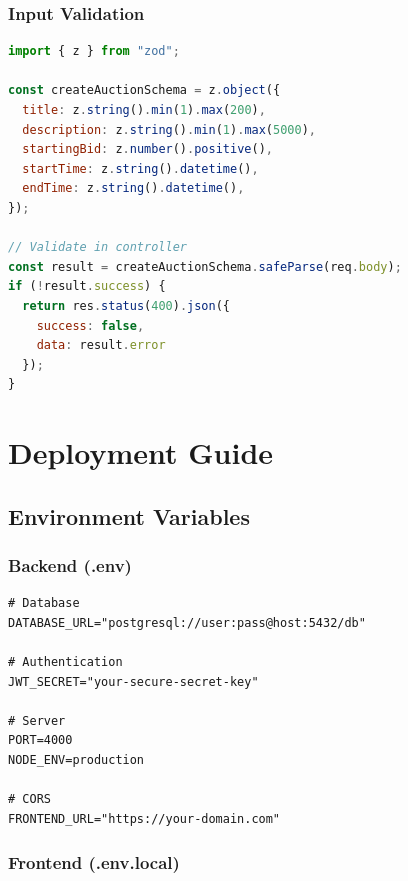 \documentclass[12pt,a4paper]{report}
\begin{document}
\subsection{Input Validation}

\begin{lstlisting}[language=JavaScript, caption=Zod Validation Example]
import { z } from "zod";

const createAuctionSchema = z.object({
  title: z.string().min(1).max(200),
  description: z.string().min(1).max(5000),
  startingBid: z.number().positive(),
  startTime: z.string().datetime(),
  endTime: z.string().datetime(),
});

// Validate in controller
const result = createAuctionSchema.safeParse(req.body);
if (!result.success) {
  return res.status(400).json({ 
    success: false, 
    data: result.error 
  });
}
\end{lstlisting}

\chapter{Deployment Guide}

\section{Environment Variables}

\subsection{Backend (.env)}

\begin{lstlisting}[caption=Backend Environment Variables]
# Database
DATABASE_URL="postgresql://user:pass@host:5432/db"

# Authentication
JWT_SECRET="your-secure-secret-key"

# Server
PORT=4000
NODE_ENV=production

# CORS
FRONTEND_URL="https://your-domain.com"
\end{lstlisting}

\subsection{Frontend (.env.local)}
\end{document}
